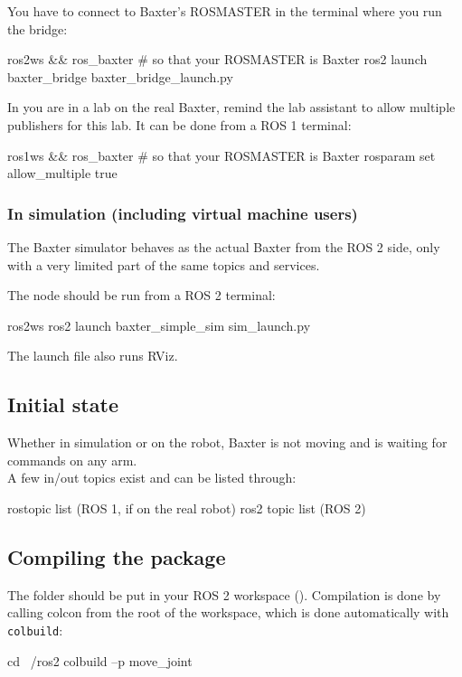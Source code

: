 \documentclass{ecnreport}
\begin{document}
You have to connect to Baxter's ROSMASTER in the terminal where you run the bridge:
\begin{bashcodelarge}
 ros2ws && ros_baxter # so that your ROSMASTER is Baxter
 ros2 launch baxter_bridge baxter_bridge_launch.py
\end{bashcodelarge}

In you are in a lab on the real Baxter, remind the lab assistant to allow multiple publishers for this lab.
It can be done from a ROS 1 terminal:
\begin{bashcodelarge}
 ros1ws && ros_baxter # so that your ROSMASTER is Baxter
 rosparam set allow_multiple true
\end{bashcodelarge}

\subsubsection{In simulation (including virtual machine users)}

The Baxter simulator behaves as the actual Baxter from the ROS 2 side, only with a very limited part of the same topics and services. 

The  node should be run from a ROS 2 terminal:
\begin{bashcodelarge}
ros2ws
ros2 launch baxter_simple_sim sim_launch.py
\end{bashcodelarge}
The launch file also runs RViz.

\subsection{Initial state}

Whether in simulation or on the robot, Baxter is not moving and is waiting for commands on any arm.\\
A few in/out topics exist and can be listed through:
\begin{bashcodelarge}
rostopic list (ROS 1, if on the real robot)
ros2 topic list (ROS 2)
\end{bashcodelarge}

\subsection{Compiling the package}

The folder should be put in your ROS 2 workspace (). Compilation is done by calling colcon from the root of the workspace, which is done automatically with \texttt{colbuild}:
\begin{bashcodelarge}
 cd ~/ros2
 colbuild --p move_joint
\end{bashcodelarge}
\end{document}
